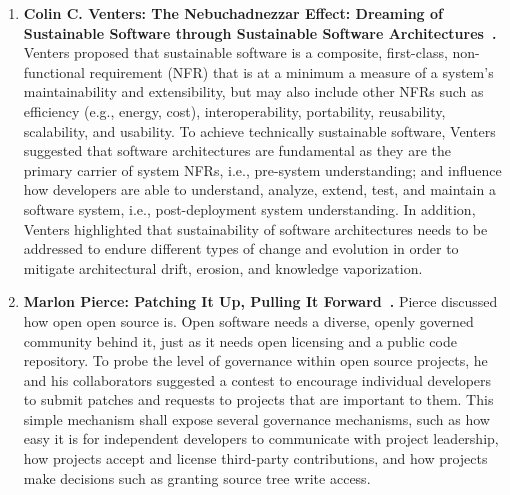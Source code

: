 \documentclass[11pt, oneside]{amsart}
\begin{document}

\begin{enumerate}
\item \textbf{Colin C. Venters: The Nebuchadnezzar Effect: Dreaming of Sustainable
Software through Sustainable Software Architectures~\cite{Venters_poster}.}
Venters proposed that sustainable software is a composite, first-class,
non-functional requirement (NFR) that is at a minimum a measure of a system's
maintainability and extensibility, but may also include other NFRs such as
efficiency (e.g., energy, cost), interoperability, portability, reusability,
scalability, and usability. To achieve technically sustainable software, Venters
suggested that software architectures are fundamental as they are the primary
carrier of system NFRs, i.e., pre-system understanding; and influence how
developers are able to understand, analyze, extend, test, and maintain a
software system, i.e., post-deployment system understanding. In addition,
Venters highlighted that sustainability of software architectures needs to be
addressed to endure different types of change and evolution in order to mitigate
architectural drift, erosion, and knowledge vaporization.



\item \textbf{Marlon Pierce: Patching It Up, Pulling It
Forward~\cite{Pierce_poster}.} Pierce discussed how open open source is. Open
software needs a diverse, openly governed community behind it, just as it needs
open licensing and a public code repository. To probe the level of governance
within open source projects, he and his collaborators %
suggested a contest to encourage individual developers to submit
patches and requests to projects that are important to them. This simple
mechanism shall expose several governance mechanisms, such as how easy it is for
independent developers to communicate with project leadership, how projects
accept and license third-party contributions, and how projects make
decisions such as granting source tree write access.


\end{enumerate}
\end{document}

